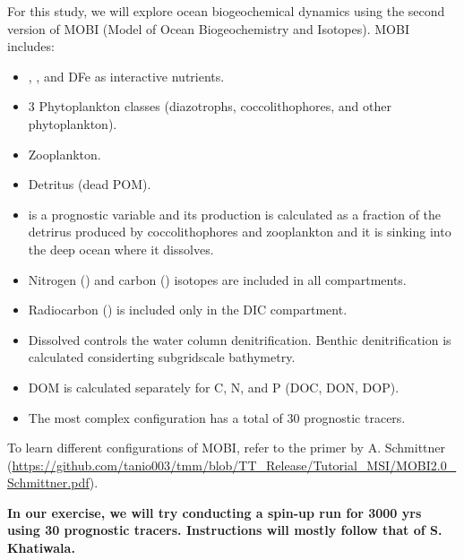 \documentclass[a4paper]{article}
\def\noin{\noindent }
\begin{document}
For this study, we will explore ocean biogeochemical dynamics using the second version of MOBI (Model of Ocean Biogeochemistry and Isotopes). MOBI includes:
\begin{itemize}
\item {}, , and DFe as interactive nutrients.
\item 3 Phytoplankton classes (diazotrophs, coccolithophores, and other phytoplankton).
\item Zooplankton.
\item Detritus (dead POM).
\item {} is a prognostic variable and its production is calculated as a fraction of the detrirus produced by coccolithophores and zooplankton and it is sinking into the deep ocean where it dissolves.
\item Nitrogen () and carbon () isotopes are included in all compartments.
\item Radiocarbon () is included only in the DIC compartment.
\item Dissolved  controls the water column denitrification. Benthic denitrification is calculated considerting subgridscale bathymetry.
\item DOM is calculated separately for C, N, and P (DOC, DON, DOP).
\item The most complex configuration has a total of 30 prognostic tracers.
\end{itemize}
\noin To learn different configurations of MOBI, refer to the primer by A. Schmittner (\url{https://github.com/tanio003/tmm/blob/TT_Release/Tutorial_MSI/MOBI2.0_Schmittner.pdf}). 

\textbf{In our exercise, we will try conducting a spin-up run for 3000 yrs using 30 prognostic tracers. Instructions will mostly follow that of S. Khatiwala.}
\end{document}
